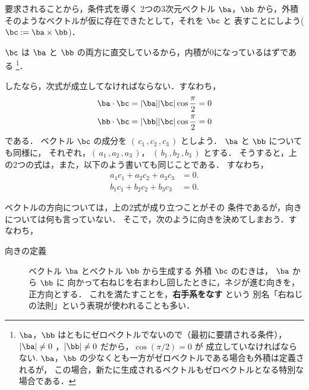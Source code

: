             \begin{mysmallsec}{要求されることから，条件式を導く}
                2つの3次元ベクトル $\ba$，$\bb$ から，外積
                そのようなベクトルが仮に存在できたとして，それを $\bc$ と
                表すことにしよう($\bc:=\ba\times\bb$)．

                $\bc$ は $\ba$ と $\bb$ の両方に直交しているから，内積が0になっているはずである
                    \footnote{
                        $\ba$，$\bb$ はともにゼロベクトルでないので（最初に要請される条件），
                        $|\ba| \neq 0$ ，$|\bb| \neq 0$ だから，$\cos(\pi/2)=0$ が
                        成立していなければならない.
                        $\ba$，$\bb$ の少なくとも一方がゼロベクトルである場合も外積は定義されるが，
                        この場合，新たに生成されるベクトルもゼロベクトルとなる特別な場合である．
                    }．

                したなら，次式が成立してなければならない．すなわち，
                    \begin{align*}
                        \ba \cdot \bc &= |\ba||\bc| \cos \frac{\pi}{2} = 0 \\
                        \bb \cdot \bc &= |\bb||\bc| \cos \frac{\pi}{2} = 0
                    \end{align*}
                である．
                ベクトル $\bc$ の成分を $(\,c_{1}\,,c_{2}\,,c_{3}\,)$ としよう．
                $\ba$ と $\bb$ についても同様に，
                それぞれ，$(\,a_{1}\,,a_{2}\,,a_{3}\,)$，
                $(\,b_{1}\,,b_{2}\,,b_{3}\,)$ とする．
                そうすると，上の2つの式は，また，以下のよう書いても同じことである．
                すなわち，
                    \begin{align*}
                        a_{1}c_{1} + a_{2}c_{2} + a_{3}c_{3} &= 0. \\
                        b_{1}c_{1} + b_{2}c_{2} + b_{3}c_{3} &= 0.
                    \end{align*}

                ベクトルの方向については，上の2式が成り立つことがその
                条件であるが，向きについては何も言っていない．
                そこで，次のように向きを決めてしまおう．すなわち，
                    \begin{description}
                        \item[向きの定義]
                            ベクトル $\ba$ とベクトル $\bb$ から生成する
                            外積 $\bc$ のむきは，
                            $\ba$ から $\bb$ に 向かって右ねじを右まわし回したときに，ネジが進む向きを，正方向とする．
                            これを満たすことを，\textbf{右手系をなす} という
                            別名「右ねじの法則」という表現が使われることも多い．
                    \end{description}


\end{mysmallsec}
